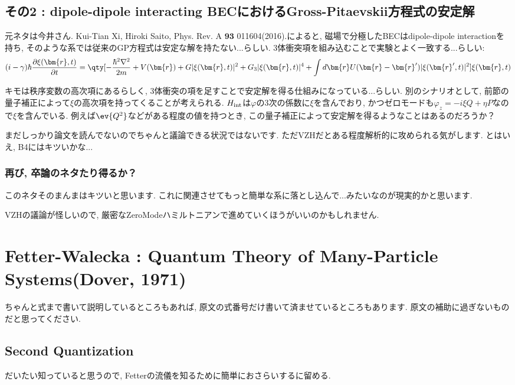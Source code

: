 \documentclass[10.5pt,a4paper]{jreport}
\begin{document}
\section{その2 : dipole-dipole interacting BECにおけるGross-Pitaevskii方程式の安定解}
元ネタは今井さん. {\rm Kui-Tian Xi, Hiroki Saito,  Phys. Rev. A $\bm{93}$ 011604(2016).}によると, 磁場で分極したBECはdipole-dipole interactionを持ち, そのような系では従来のGP方程式は安定な解を持たない...らしい. 3体衝突項を組み込むことで実験とよく一致する...らしい:
\begin{eqnarray}
  (i-\gamma )\hbar\frac{\partial \xi (\bm{r}, t)}{\partial t} = \qty[-\frac{\hbar^2\nabla^2}{2m} + V(\bm{r}) + G|\xi (\bm{r}, t)|^2 + G_3|\xi (\bm{r}, t)|^4 + \int d\bm{r} U(\bm{r} - \bm{r}')|\xi (\bm{r}', t)|^2]\xi (\bm{r}, t)
\end{eqnarray}

キモは秩序変数の高次項にあるらしく, 3体衝突の項を足すことで安定解を得る仕組みになっている...らしい. 別のシナリオとして, 前節の量子補正によって$\xi$の高次項を持ってくることが考えられる. $H_{\rm int}$は$\varphi$の3次の係数に$\xi$を含んでおり, かつゼロモードも$\varphi_z = -i\xi Q + \eta P$なので$\xi$を含んでいる. 例えば$\ev{Q^2}$などがある程度の値を持つとき, この量子補正によって安定解を得るようなことはあるのだろうか？

まだしっかり論文を読んでないのでちゃんと議論できる状況ではないです. ただVZHだとある程度解析的に攻められる気がします. とはいえ, B4にはキツいかな...
\subsection{再び, 卒論のネタたり得るか？}
このネタそのまんまはキツいと思います. これに関連させてもっと簡単な系に落とし込んで...みたいなのが現実的かと思います.

VZHの議論が怪しいので, 厳密なZeroModeハミルトニアンで進めていくほうがいいのかもしれません. 

\newpage
\chapter{Fetter-Walecka : Quantum Theory of Many-Particle Systems(Dover, 1971)}
ちゃんと式まで書いて説明しているところもあれば, 原文の式番号だけ書いて済ませているところもあります. 原文の補助に過ぎないものだと思ってください. 
\section{Second Quantization}
だいたい知っていると思うので, Fetterの流儀を知るために簡単におさらいするに留める.
\end{document}
